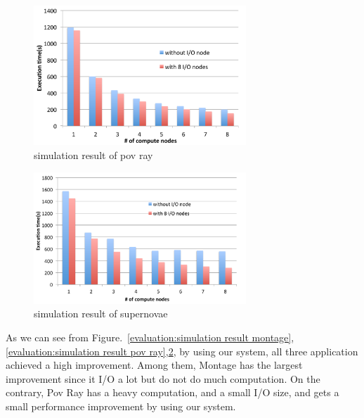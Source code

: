 \begin{figure}
\centering
\includegraphics[width=8cm]{img/simulation_povray}
\caption{simulation result of pov ray}
\label{evaluation:simulation result pov ray}
\end{figure}

\begin{figure}
\centering
\includegraphics[width=8cm]{img/simulation_supernovae}
\caption{simulation result of supernovae}
\label{evaluation:simulation result supernovae}
\end{figure}

As we can see from Figure.~\ref{evaluation:simulation result montage},\ref{evaluation:simulation
result pov ray},\ref{evaluation:simulation result supernovae}, by using our system, all three
application achieved a high improvement.
Among them, Montage has the largest improvement since it I/O a lot but do not do much
computation.
On the contrary, Pov Ray has a heavy computation, and a small I/O size, and gets a small performance
improvement by using our system.
